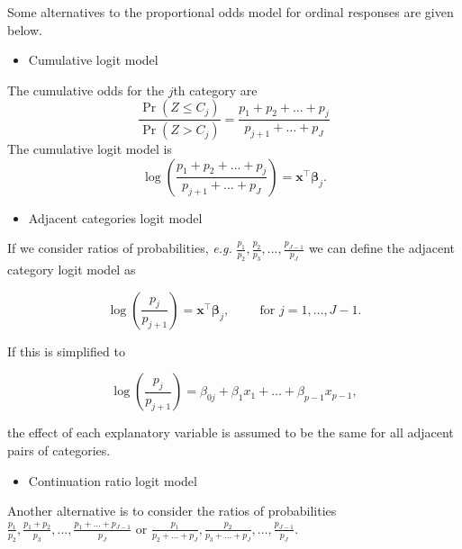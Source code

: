 \documentclass[
  letterpaper,
  DIV=11,
  numbers=noendperiod]{scrartcl}
\providecommand{\tightlist}{%
  \setlength{\itemsep}{0pt}\setlength{\parskip}{0pt}}\usepackage{longtable,booktabs,array}
\begin{document}
\begin{tcolorbox}[enhanced jigsaw, coltitle=black, opacitybacktitle=0.6, title=\textcolor{quarto-callout-note-color}{\faInfo}\hspace{0.5em}{Note}, titlerule=0mm, toprule=.15mm, bottomtitle=1mm, colback=white, colbacktitle=quarto-callout-note-color!10!white, arc=.35mm, leftrule=.75mm, breakable, bottomrule=.15mm, rightrule=.15mm, toptitle=1mm, left=2mm, opacityback=0, colframe=quarto-callout-note-color-frame]

Some alternatives to the proportional odds model for ordinal responses
are given below.

\begin{itemize}
\tightlist
\item
  Cumulative logit model
\end{itemize}

The cumulative odds for the \(j\)th category are
\[\frac{\Pr(Z\leq C_j)}{\Pr(Z>C_j)}=\frac{p_1+p_2+\dots+p_j}{p_{j+1}+\dots+p_J}\]
The cumulative logit model is
\[\log \left(\frac{p_1+p_2+\dots+p_j}{p_{j+1}+\dots+p_J}\right)=\boldsymbol{x}^\intercal \boldsymbol{\beta}_j.\]

\begin{itemize}
\tightlist
\item
  Adjacent categories logit model
\end{itemize}

If we consider ratios of probabilities, \emph{e.g.}
\(\frac{p_1}{p_2}, \frac{p_2}{p_3},\dots, \frac{p_{J-1}}{p_J}\) we can
define the adjacent category logit model as

\[
 \log \left(\frac{p_j}{p_{j+1}}\right)=\boldsymbol{x}^\intercal \boldsymbol{\beta}_j, \hspace{1cm} \text{for } j=1,\dots,J-1. 
\]

If this is simplified to

\[
\log \left(\frac{p_j}{p_{j+1}}\right)=\beta_{0j}+\beta_1 x_1 + \dots + \beta_{p-1}x_{p-1}, 
\]

the effect of each explanatory variable is assumed to be the same for
all adjacent pairs of categories.

\begin{itemize}
\tightlist
\item
  Continuation ratio logit model
\end{itemize}

Another alternative is to consider the ratios of probabilities
\(\frac{p_1}{p_2}, \frac{p_1+p_2}{p_3},\dots, \frac{p_1+\dots+p_{J-1}}{p_J}\)
or
\(\frac{p_1}{p_2+\dots+p_J}, \frac{p_2}{p_3+\dots+p_J},\dots, \frac{p_{J-1}}{p_J}\).


\end{tcolorbox}
\end{document}
